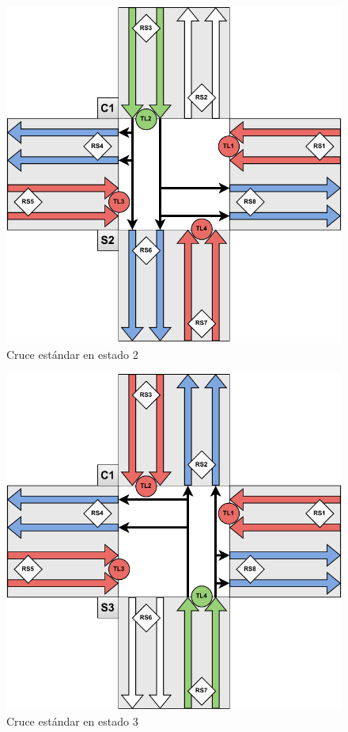 \begin{figure}[H]
    \centering
    \includegraphics[width=1\linewidth]{text/image/DCruc-CE-Estado2.pdf}
    \caption{Cruce estándar en estado 2}
    \label{fig:cruce_estandar_estado_2}
\end{figure}

\begin{figure}[H]
    \centering
    \includegraphics[width=1\linewidth]{text/image/DCruc-CE-Estado3.pdf}
    \caption{Cruce estándar en estado 3}
    \label{fig:cruce_estandar_estado_3}
\end{figure}

